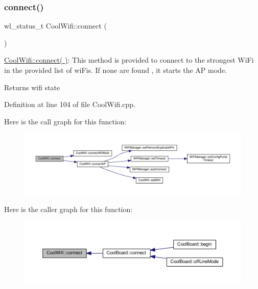 \subsubsection{\texorpdfstring{connect()}{connect()}}
{\footnotesize\ttfamily wl\+\_\+status\+\_\+t Cool\+Wifi\+::connect (\begin{DoxyParamCaption}{ }\end{DoxyParamCaption})}

\hyperlink{class_cool_wifi_ad060353050f40d032a2dbf9e54a768bf}{Cool\+Wifi\+::connect( )}\+: This method is provided to connect to the strongest Wi\+Fi in the provided list of wi\+Fis. If none are found , it starts the AP mode.

\begin{DoxyReturn}{Returns}
wifi state 
\end{DoxyReturn}


Definition at line 104 of file Cool\+Wifi.\+cpp.

Here is the call graph for this function\+:
\nopagebreak
\begin{figure}[H]
\begin{center}
\leavevmode
\includegraphics[width=350pt]{class_cool_wifi_ad060353050f40d032a2dbf9e54a768bf_cgraph}
\end{center}
\end{figure}
Here is the caller graph for this function\+:
\nopagebreak
\begin{figure}[H]
\begin{center}
\leavevmode
\includegraphics[width=350pt]{class_cool_wifi_ad060353050f40d032a2dbf9e54a768bf_icgraph}
\end{center}
\end{figure}
\mbox{\label{class_cool_wifi_a7c857f27161782f5ef1d62d552aff971}} 
